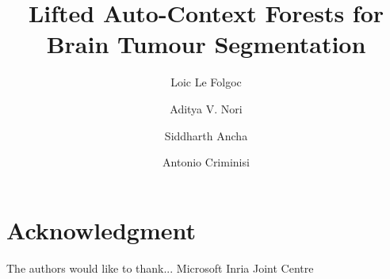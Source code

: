 \documentclass[runningheads,a4paper]{llncs}
\begin{document}
\mainmatter

\title{Lifted Auto-Context Forests for Brain Tumour Segmentation%
}
\titlerunning{Lifted Auto-Context Forests for BRATS%
}

\author{Loic Le Folgoc \and Aditya V. Nori \and Siddharth Ancha \and Antonio Criminisi}

\toctitle{}
\tocauthor{}
\maketitle




\begin{abstract}

\end{abstract}


















\section*{Acknowledgment}

The authors would like to thank...
Microsoft Inria Joint Centre

{\small


}

\appendix
\end{document}
